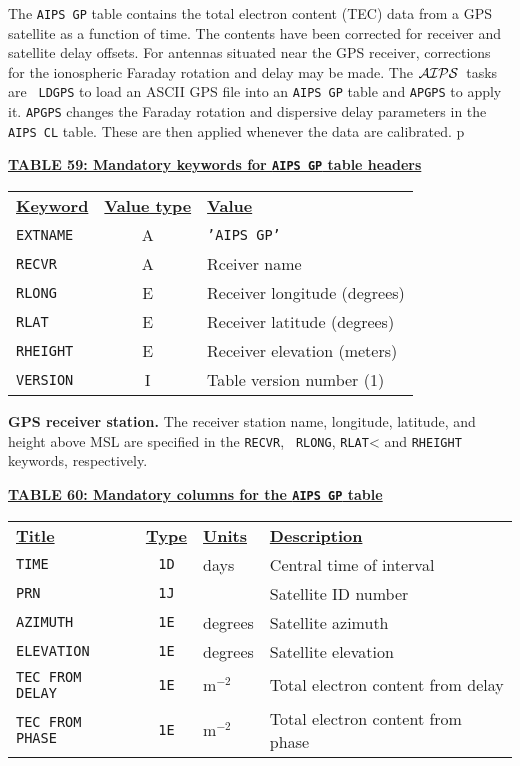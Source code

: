\documentclass[twoside]{article}
\newcommand{\AIPS}{{$\cal AIPS\/$}}
\begin{document}
The {\tt AIPS GP} table contains the total electron content (TEC) data
from a GPS satellite as a function of time.  The contents have been
corrected for receiver and satellite delay offsets.  For antennas
situated near the GPS receiver, corrections for the ionospheric
Faraday rotation and delay may be made.  The \AIPS\ tasks are {\tt
  LDGPS} to load an ASCII GPS file into an {\tt AIPS GP} table and
{\tt APGPS} to apply it.  {\tt APGPS} changes the Faraday rotation and
dispersive delay parameters in the {\tt AIPS CL} table.  These are
then applied whenever the data are calibrated.
p
\begin{center}
\underline{\bf{TABLE 59: Mandatory keywords for {\tt AIPS GP} table
    headers}}\\
\begin{tabular}{lcl}
\noalign{\vspace{2pt}} \label{ta:GPkeys}
\underline{{\bf Keyword}} & \underline{\bf{Value type}} &
    \underline{\bf{Value\vphantom{y}}} \\
\noalign{\vspace{2pt}}
{\tt EXTNAME} & A & {\tt 'AIPS GP'}  \\
{\tt RECVR}   & A & Rceiver name \\
{\tt RLONG}   & E & Receiver longitude (degrees) \\
{\tt RLAT}    & E & Receiver latitude (degrees) \\
{\tt RHEIGHT} & E & Receiver elevation (meters) \\
{\tt VERSION} & I & Table version number (1)
\end{tabular}
\end{center}

{\bf GPS receiver station.} The receiver station name, longitude,
latitude, and height above MSL are specified in the {\tt RECVR}, {\tt
  RLONG}, {\tt RLAT}< and {\tt RHEIGHT} keywords, respectively.

\begin{center}
\underline{\bf{TABLE 60: Mandatory columns for the {\tt AIPS GP} table}}\\
\begin{tabular}{lcll}
\noalign{\vspace{2pt}} \label{ta:GPcols}
\underline{{\bf Title\vphantom{y}}} & \underline{\bf{Type}} &
   \underline{{\bf Units\vphantom{y}}} & \underline{\bf{Description}} \\
\noalign{\vspace{2pt}}
{\tt TIME}           & {\tt 1D} & days & Central time of interval \\
{\tt PRN}            & {\tt 1J} &      & Satellite ID number \\
{\tt AZIMUTH}        & {\tt 1E} & degrees & Satellite azimuth \\
{\tt ELEVATION}      & {\tt 1E} & degrees & Satellite elevation \\
{\tt TEC FROM DELAY} & {\tt 1E} & m$^{-2}$ & Total electron content from delay \\
{\tt TEC FROM PHASE} & {\tt 1E} & m$^{-2}$ &  Total electron content from phase
\end{tabular}
\end{center}
\end{document}
